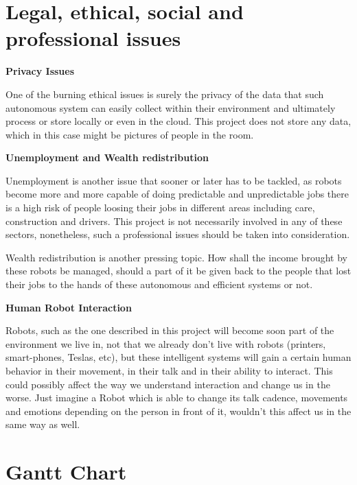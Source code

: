 \begin{appendices}
\chapter{Legal, ethical, social and professional issues}

\textbf{Privacy Issues}

One of the burning ethical issues is surely the privacy of the data that such autonomous system can easily collect within their environment and ultimately process or store locally or even in the cloud. This project does not store any data, which in this case might be pictures of people in the room.

\textbf{Unemployment and Wealth redistribution}

Unemployment is another issue that sooner or later has to be tackled, as robots become more and more capable of doing predictable and unpredictable jobs there is a high risk of people loosing their jobs in different areas including care, construction and drivers. This project is not necessarily involved in any of these sectors, nonetheless, such a professional issues should be taken into consideration. 

Wealth redistribution is another pressing topic. How shall the income brought by these robots be managed, should a part of it be given back to the people that lost their jobs to the hands of these autonomous and efficient systems or not.

\textbf{Human Robot Interaction}

Robots, such as the one described in this project will become soon part of the environment we live in, not that we already don't live with robots (printers, smart-phones, Teslas, etc), but these intelligent systems will gain a certain human behavior in their movement, in their talk and in their ability to interact. This could possibly affect the way we understand interaction and change us in the worse. Just imagine a Robot which is able to change its talk cadence, movements and emotions depending on the person in front of it, wouldn't this affect us in the same way as well.

\chapter{Gantt Chart}

\begin{landscape}


\end{landscape}
\end{appendices}
